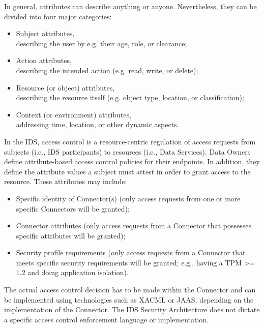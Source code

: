 
In general, attributes can describe anything or anyone. Nevertheless, they can be divided into four major categories:

\begin{itemize}
	\item Subject attributes,\\
describing the user by e.g. their age, role, or clearance;

	\item Action attributes,\\
describing the intended action (e.g. read, write, or delete);

	\item Resource (or object) attributes,\\
describing the resource itself (e.g. object type, location, or classification);

	\item Context (or environment) attributes,\\
addressing time, location, or other dynamic aspects.
\end{itemize}

In the IDS, access control is a resource-centric regulation of access requests from subjects (i.e., IDS participants) to resources (i.e., Data Services). Data Owners define attribute-based access control policies for their endpoints. In addition, they define the attribute values a subject must attest in order to grant access to the resource. These attributes may include: 



\begin{itemize}
	\item Specific identity of Connector(s) (only access requests from one or more specific Connectors will be granted);

	\item Connector attributes (only access requests from a Connector that possesses specific attributes will be granted);

	\item Security profile requirements (only access requests from a Connector that meets specific security requirements will be granted; e.g., having a TPM >= 1.2 and doing application isolation).
\end{itemize}

The actual access control decision has to be made within the Connector and can be implemented using technologies such as XACML or JAAS, depending on the implementation of the Connector. The IDS Security Architecture does not dictate a specific access control enforcement language or implementation.

